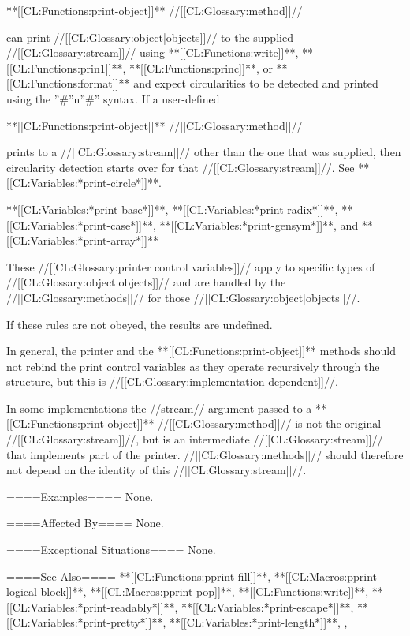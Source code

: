 **[[CL:Functions:print-object]]** //[[CL:Glossary:method]]//

can print //[[CL:Glossary:object|objects]]// to the supplied //[[CL:Glossary:stream]]// using **[[CL:Functions:write]]**, **[[CL:Functions:prin1]]**, **[[CL:Functions:princ]]**, or **[[CL:Functions:format]]** and expect circularities to be detected and printed using the ''#''n''#'' syntax. If a user-defined

**[[CL:Functions:print-object]]** //[[CL:Glossary:method]]//

prints to a //[[CL:Glossary:stream]]// other than the one that was supplied, then circularity detection starts over for that //[[CL:Glossary:stream]]//. See **[[CL:Variables:*print-circle*]]**.

\item{**[[CL:Variables:*print-base*]]**, **[[CL:Variables:*print-radix*]]**, **[[CL:Variables:*print-case*]]**, **[[CL:Variables:*print-gensym*]]**, and **[[CL:Variables:*print-array*]]**}

These //[[CL:Glossary:printer control variables]]// apply to specific types of //[[CL:Glossary:object|objects]]// and are handled by the //[[CL:Glossary:methods]]// for those //[[CL:Glossary:object|objects]]//.

\endlist

If these rules are not obeyed, the results are undefined.


In general, the printer and the **[[CL:Functions:print-object]]** methods should not rebind the print control variables as they operate recursively through the structure, but this is //[[CL:Glossary:implementation-dependent]]//.

In some implementations the //stream// argument passed to a **[[CL:Functions:print-object]]** //[[CL:Glossary:method]]// is not the original //[[CL:Glossary:stream]]//, but is an intermediate //[[CL:Glossary:stream]]// that implements part of the printer. //[[CL:Glossary:methods]]// should therefore not depend on the identity of this //[[CL:Glossary:stream]]//.




====Examples====
None.

====Affected By====
None.

====Exceptional Situations====
None.

====See Also====
**[[CL:Functions:pprint-fill]]**, **[[CL:Macros:pprint-logical-block]]**, **[[CL:Macros:pprint-pop]]**, **[[CL:Functions:write]]**, **[[CL:Variables:*print-readably*]]**, **[[CL:Variables:*print-escape*]]**, **[[CL:Variables:*print-pretty*]]**, **[[CL:Variables:*print-length*]]**, {\secref\DefaultPrintObjMeths},

